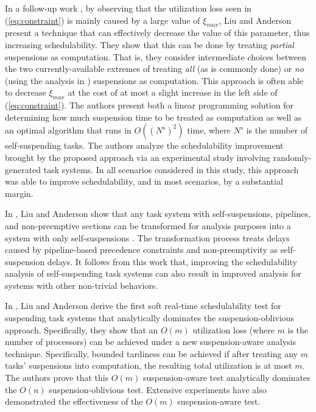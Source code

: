 In a follow-up work \cite{Liu5}, by observing that the utilization loss seen in (\ref{eq:constraint}) is mainly caused by a large value of $\xi_{max}$, Liu and Anderson present a technique that can effectively decrease the value of this parameter, thus increasing schedulability. They show that this can be done by treating \textit{partial} suspensions as computation. That is, they consider intermediate choices between the two currently-available extremes of treating \textit{all} (as is commonly done) or \textit{no} (using the analysis in \cite{Liu093}) suspensions as computation. This approach is often able to decrease $\xi_{max}$ at the cost of at most a slight increase in the left side of (\ref{eq:constraint}). The authors present both a linear programming solution for determining how much suspension time to be treated as computation as well as an optimal algorithm that runs in $O((N^s)^2)$ time, where $N^s$ is the number of self-suspending tasks. The authors analyze the schedulability improvement brought by the proposed approach via an experimental study involving randomly-generated task systems. In all scenarios considered in this study, this approach was able to improve schedulability, and in most scenarios, by a substantial margin. 

In \cite{Liu4}, Liu and Anderson  show that any task system with self-suspensions, pipelines, and
non-preemptive sections can be transformed for analysis purposes into a system with only self-suspensions \cite{Liu4}. The transformation process treats delays caused by pipeline-based precedence constraints and non-preemptivity as self-suspension delays. It follows from this work that, improving the schedulability analysis of self-suspending task systems can also result in improved analysis for systems with other non-trivial behaviors.

In \cite{Liu9, Liu11}, Liu and Anderson derive the first soft real-time schedulability test for suspending task systems that analytically dominates the suspension-oblivious approach. Specifically, they show that an $O(m)$ utilization loss (where $m$ is the number of processors) can be achieved under a new suspension-aware analysis technique. Specifically, bounded tardiness can be achieved if after treating any $m$ tasks' suspensions into computation, the resulting total utilization is at most $m$. The authors prove that this $O(m)$ suspension-aware test analytically dominates the $O(n)$ suspension-oblivious test. Extensive experiments have also demonstrated the effectiveness of the $O(m)$ suspension-aware test.
